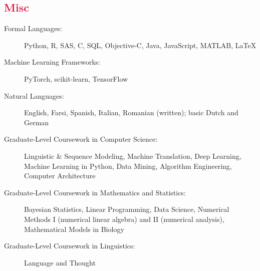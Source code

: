 \documentclass[margin, 10pt]{res} %
\let\oldsection\section
\renewcommand{\section}[1]{\oldsection{\textcolor{crimson}{#1}}}
\newcommand{\CPP}
{C\nolinebreak[4]\hspace{-.05em}\raisebox{.22ex}{\footnotesize\bf ++}}
\newcommand{\JHU}{\href{https://www.jhu.edu/}{Johns Hopkins University}}
\newcommand{\SMU}{\href{https://www.smu.edu/}{Southern Methodist University}}
\begin{document}
\begin{resume}

%


\section{Misc}

\begin{description}
\item[Formal Languages:] Python, R, SAS, \CPP, SQL, Objective-C, Java, JavaScript, MATLAB, \LaTeX
\item[Machine Learning Frameworks:] PyTorch, scikit-learn, TensorFlow
\item[Natural Languages:] English, Farsi, Spanish, Italian, Romanian (written); basic Dutch and German
\item[Graduate-Level Coursework in Computer Science:] Linguistic \& Sequence Modeling, Machine Translation, Deep Learning, Machine Learning in Python, Data Mining, Algorithm Engineering, Computer Architecture
\item[Graduate-Level Coursework in Mathematics and Statistics:] Bayesian Statistics, Linear Programming, Data Science, Numerical Methods I (numerical linear algebra) and II (numerical analysis), Mathematical Models in Biology
\item[Graduate-Level Coursework in Linguistics:] Language and Thought
\end{description}


\end{resume}
\end{document}
